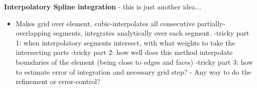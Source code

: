 \documentclass[12pt]{article}
\begin{document}
\noindent
\textbf{Interpolatory Spline integration} - this is just another idea...
\begin{itemize}
	\item Makes grid over element, cubic-interpolates all consecutive partially-overlapping segments, integrates analytically over each segment.
		\subitem -tricky part 1: when interpolatory segments intersect, with what weights to take the intersecting parts
		\subitem -tricky part 2: how well does this method interpolate boundaries of the element (being close to edges and faces)
		\subitem -tricky part 3: how to estimate error of integration and necessary grid step?
		\subitem - Any way to do the refinement or error-control?
\end{itemize}
\end{document}
